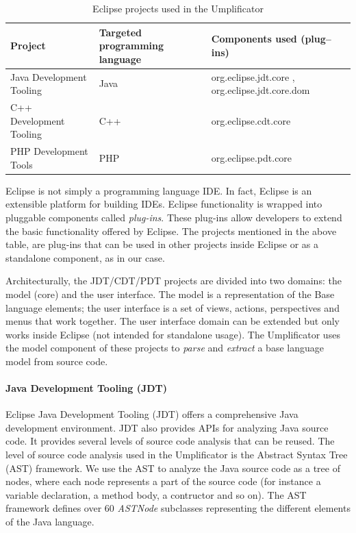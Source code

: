 \begin{table}[ht]
\caption{Eclipse projects used in the Umplificator}
\label{table:xdtProjects}
\begin{tabular}{l|p{4cm}p{5cm}}
\toprule
\rowcolor[HTML]{BBDAFF}
\textbf{Project} & \textbf{Targeted programming language}  & \textbf{Components used (plug--ins)}  \\ \hline
	Java Development Tooling & Java   & org.eclipse.jdt.core , org.eclipse.jdt.core.dom  \\ \hline
	C++ Development Tooling  & C++   & org.eclipse.cdt.core \\ \hline
	PHP Development Tools	 & PHP   & org.eclipse.pdt.core \\ \hline
\end{tabular}
\end{table}

Eclipse is not simply a programming language IDE. In fact,  Eclipse is an extensible platform for building IDEs. Eclipse functionality is wrapped into pluggable components called \textit{plug-ins}. These plug-ins allow developers to extend the basic functionality offered by Eclipse. The projects mentioned in the above table, are plug-ins that can be used in other projects inside Eclipse or as a standalone component, as in our case.

Architecturally, the JDT/CDT/PDT projects are divided into two domains: the model (core) and the user interface. The model is a representation of the Base language elements; the user interface is a set of views, actions, perspectives and menus that work together. The user interface domain can be extended but only works inside Eclipse (not intended for standalone usage).  The Umplificator uses the model component of these projects to \textit{parse} and \textit{extract} a base language model from source code. 

\paragraph*{Java Development Tooling (JDT)}

 Eclipse Java Development Tooling (JDT) \cite{jdtProject} offers a comprehensive Java development environment. JDT also provides APIs for analyzing Java source code. It provides several levels of source code analysis that can be reused. The level of source code analysis used in the Umplificator is the Abstract Syntax Tree (AST) framework. We use the AST to analyze the Java source code as a tree of nodes, where each node represents a part of the source code (for instance a variable declaration, a method body, a contructor and so on). The AST framework defines over 60 \textit{ASTNode} \cite{astnodeapi} subclasses representing the different elements of the Java language. 
 
